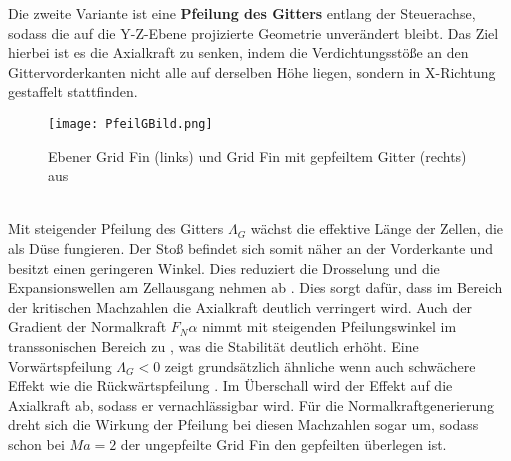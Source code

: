 Die zweite Variante ist eine \textbf{Pfeilung des Gitters} entlang der Steuerachse, sodass die auf die Y-Z-Ebene projizierte Geometrie unverändert bleibt. Das Ziel hierbei ist es die Axialkraft zu senken, indem die Verdichtungsstöße an den Gittervorderkanten nicht alle auf derselben Höhe liegen, sondern in X-Richtung gestaffelt stattfinden.
\begin{figure}[h]
	\centering
	\texttt{[image: PfeilGBild.png]}
	\caption{Ebener Grid Fin (links) und Grid Fin mit gepfeiltem Gitter (rechts) aus \cite{PfeilG3}}
\end{figure}\\
Mit steigender Pfeilung des Gitters $\Lambda_G$ wächst die effektive Länge der Zellen, die als Düse fungieren. Der Stoß befindet sich somit näher an der Vorderkante und besitzt einen geringeren Winkel. Dies reduziert die Drosselung und die Expansionswellen am Zellausgang nehmen ab \cite{PfeilG1}. Dies sorgt dafür, dass im Bereich der kritischen Machzahlen die Axialkraft deutlich verringert wird. Auch der Gradient der Normalkraft $F_N\alpha$ nimmt mit steigenden Pfeilungswinkel im transsonischen Bereich zu \cite{PfeilG1}, was die Stabilität deutlich erhöht. Eine Vorwärtspfeilung $\Lambda_{G} < 0$ zeigt grundsätzlich ähnliche wenn auch schwächere Effekt wie die Rückwärtspfeilung \cite{PfeilG2}. Im Überschall wird der Effekt auf die Axialkraft ab, sodass er vernachlässigbar wird. Für die Normalkraftgenerierung dreht sich die Wirkung der Pfeilung bei diesen Machzahlen sogar um, sodass schon bei $Ma=2$ der ungepfeilte Grid Fin den gepfeilten überlegen ist.

